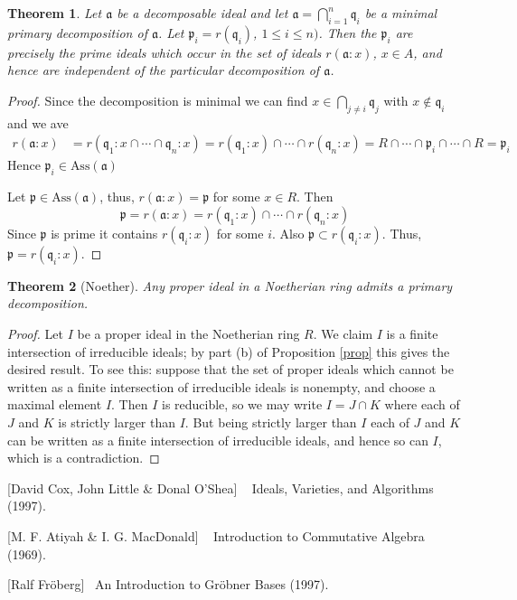 \documentclass[	DIV=calc,paper=a4,fontsize=11pt]{scrartcl}	 					%
\newtheorem{thm}{Theorem}[section]
\theoremstyle{definition}
\theoremstyle{plain}
\theoremstyle{remark}
\begin{document}
\begin{thm}
Let $\mathfrak{a}$ be a decomposable ideal and let $\mathfrak{a} = \bigcap_{i=1}^n \mathfrak{q}_i$ be a minimal primary decomposition of $\mathfrak{a}$. Let $\mathfrak{p}_i= r(\mathfrak{q}_i)$, $1\leq i\leq n)$. Then the $\mathfrak{p}_i$ are precisely the prime ideals which occur in the set of ideals $r(\mathfrak{a}:x)$, $x\in A$, and hence are independent of the particular decomposition of $\mathfrak{a}$.
\end{thm}

\begin{proof}
Since the decomposition is minimal we can find $x\in \bigcap_{j\neq i}\mathfrak{q}_j$ with $x\notin \mathfrak{q}_i$ and we ave
\begin{align*}
r(\mathfrak{a}:x)&=r(\mathfrak{q}_1:x\cap\cdots\cap \mathfrak{q}_n:x)
   =r(\mathfrak{q}_1:x)\cap\cdots\cap r(\mathfrak{q}_n:x)
   =R\cap\cdots\cap\mathfrak{p}_i\cap\cdots\cap R=\mathfrak{p}_i
\end{align*}
Hence $\mathfrak{p}_i\in \mbox{Ass}(\mathfrak{a})$

\medskip

Let $\mathfrak{p}\in\mbox{Ass}(\mathfrak{a})$, thus, $r(\mathfrak{a}:x)=\mathfrak{p}$ for some $x\in R$.
Then
\[
\mathfrak{p}=r(\mathfrak{a}:x)=r(\mathfrak{q}_1:x)\cap\cdots\cap r(\mathfrak{q}_n:x)\]
Since $\mathfrak{p}$ is prime it contains $r(\mathfrak{q}_i:x)$ for some $i$. Also $\mathfrak{p}\subset r(\mathfrak{q}_i:x)$.
Thus, $\mathfrak{p}=r(\mathfrak{q}_i:x)$.
\end{proof}

\begin{thm}[Noether]
Any proper ideal in a Noetherian ring admits a primary decomposition.
\end{thm}
\begin{proof}
Let $I$ be a proper ideal in the Noetherian ring $R$. We claim $I$ is a finite intersection of irreducible ideals; by part (b) of Proposition \ref{prop} this gives the desired result. To see this: suppose that the set of proper ideals which cannot be written as a finite intersection of irreducible ideals is nonempty, and choose a maximal element $I$. Then $I$ is reducible, so we may write $I = J\cap K$ where each of $J$ and $K$ is strictly larger than $I$. But being strictly larger than $I$ each of $J$ and $K$ can be written as a finite intersection of irreducible ideals, and hence so can $I$, which is a contradiction.
\end{proof}

\begin{thebibliography}{9}

[David Cox, John Little \& Donal O'Shea] ~
 Ideals, Varieties, and Algorithms (1997).

[M. F. Atiyah \& I. G. MacDonald]  ~
Introduction to Commutative Algebra (1969).

[Ralf Fr\"{o}berg]~
\newblock An Introduction to Gr\"{o}bner Bases (1997).
\end{thebibliography}
\end{document}

